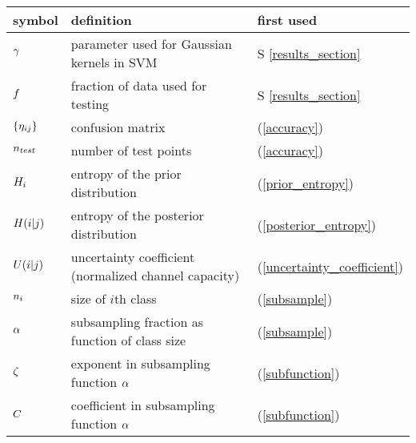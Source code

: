 \begin{tabular}{lll}
symbol & definition & first used \\ \hline
	$\gamma$ & parameter used for Gaussian kernels in SVM & S \ref{results_section} \\
	$f$ & fraction of data used for testing & S \ref{results_section} \\
	$\lbrace \eta_{ij} \rbrace$ & confusion matrix & (\ref{accuracy}) \\
	$n_{test}$ & number of test points & (\ref{accuracy}) \\
	$H_i$ & entropy of the prior distribution & (\ref{prior_entropy}) \\
	$H(i|j)$ & entropy of the posterior distribution & (\ref{posterior_entropy}) \\
	$U(i|j)$ & uncertainty coefficient (normalized channel capacity) & (\ref{uncertainty_coefficient}) \\
	$n_i$ & size of $i$th class & (\ref{subsample}) \\
	$\alpha$ & subsampling fraction as function of class size & (\ref{subsample}) \\
	$\zeta$ & exponent in subsampling function $\alpha$ & (\ref{subfunction}) \\
	$C$ & coefficient in subsampling function $\alpha$ & (\ref{subfunction}) \\
\end{tabular}

